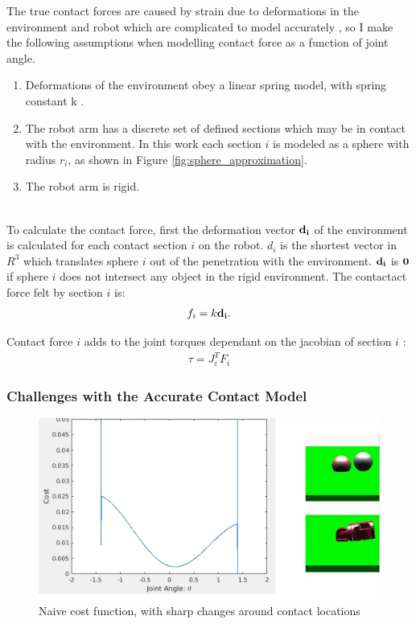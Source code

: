 \documentclass[../thesis.tex]{subfiles}
\begin{document}
The true contact forces are caused by strain due to deformations in the environment and robot which are complicated to model accurately \cite{Saund2013}, so I make the following assumptions when modelling contact force as a function of joint angle.
\begin{enumerate}
\item Deformations of the environment obey a linear spring model, with spring constant k \cite{blandford2003applications}.
\item The robot arm has a discrete set of defined sections which may be in contact with the environment. In this work each section $i$ is modeled as a sphere with radius $r_i$, as shown in Figure \ref{fig:sphere_approximation}.
\item The robot arm is rigid.
\end{enumerate}\\



To calculate the contact force, first the deformation vector ${\bf d_i}$ of the environment is calculated for each contact section $i$ on the robot.
$d_i$ is the shortest vector in $R^3$ which translates sphere $i$ out of the penetration with the environment.
${\bf d_i}$ is ${\bf 0}$ if sphere $i$ does not intersect any object in the rigid environment.
The contactact force felt by section $i$ is:
\begin{align}
  f_i = k {\bf d_i}.
\end{align}

Contact force $i$ adds to the joint torques dependant on the jacobian of section $i$ \cite{murray1994mathematical}:
\begin{align}
  \tau = J_{i}^T F_i
\end{align}



\subsubsection{Challenges with the Accurate Contact Model}
\begin{figure}
  \centering
  \includegraphics[width=\linewidth]{./Planning/naive_cost}
  \caption{Naive cost function, with sharp changes around contact locations}
  \label{fig:naive_cost}
\end{figure}
\end{document}
